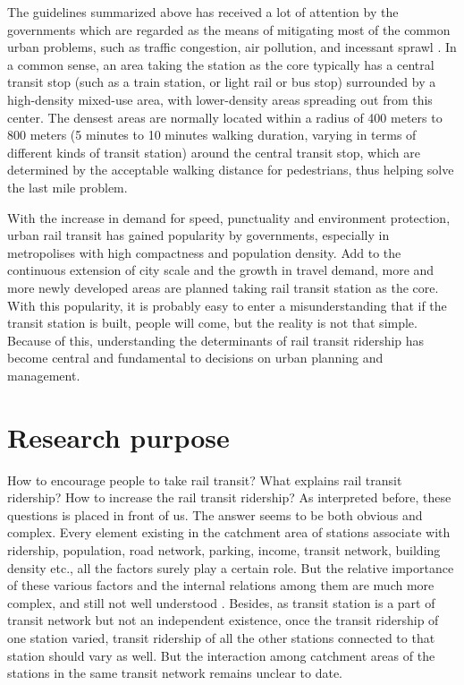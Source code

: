 The guidelines summarized above has received a lot of attention by the governments which are regarded as the means of mitigating most of the common urban problems, such as traffic congestion, air pollution, and incessant sprawl \cite{cervero2002transit}. In a common sense, an area taking the station as the core typically has a central transit stop (such as a train station, or light rail or bus stop) surrounded by a high-density mixed-use area, with lower-density areas spreading out from this center. The densest areas are normally located within a radius of 400 meters to 800 meters (5 minutes to 10 minutes walking duration, varying in terms of different kinds of transit station) around the central transit stop, which are determined by the acceptable walking distance for pedestrians, thus helping solve the last mile problem.

With the increase in demand for speed, punctuality and environment protection, urban rail transit has gained popularity by governments, especially in metropolises with high compactness and population density. Add to the continuous extension of city scale and the growth in travel demand, more and more newly developed areas are planned taking rail transit station as the core. With this popularity, it is probably easy to enter a misunderstanding that if the transit station is built, people will come, but the reality is not that simple. Because of this, understanding the determinants of rail transit ridership has become central and fundamental to decisions on urban planning and management. 

% 
\section{Research purpose}
How to encourage people to take rail transit? What explains rail transit ridership? How to increase the rail transit ridership? As interpreted before, these questions is placed in front of us. The answer seems to be both obvious and complex. Every element existing in the catchment area of stations associate with ridership, population, road network, parking, income, transit network, building density etc., all the factors surely play a certain role. But the relative importance of these various factors and the internal relations among them are much more complex, and still not well understood \cite{taylor2003factors}. Besides, as transit station is a part of transit network but not an independent existence, once the transit ridership of one station varied, transit ridership of all the other stations connected to that station should vary as well. But the interaction among catchment areas of the stations in the same transit network remains unclear to date.

